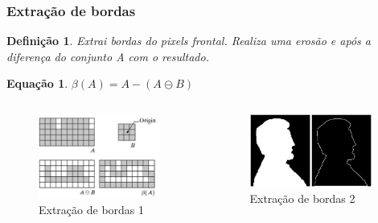 \documentclass[aspectratio=169]{beamer}
\theoremstyle{Definition}
\newtheorem{defn}{Defini\c c\~ao}
\newtheorem{eq}[theorem]{Equa\c c\~ao}
\begin{document}
\begin{frame}
	\frametitle{Extração de bordas}
	
	\begin{defn}
    	Extrai bordas do pixels frontal. Realiza uma erosão e após a diferença do conjunto A com o resultado.
	\end{defn}
	
	\begin{eq}
    	$ \beta(A) = A  - (A \circleddash B)$ 
	\end{eq}
	
	\begin{columns}
		\begin{column}{0.5\textwidth}
			\begin{figure}[h]
	  		 	\includegraphics[width=4cm, height=0.25\paperheight]{imagens/border_ex1}
				\caption{Extração de bordas 1}\label{figBorder1}
			\end{figure}
		\end{column}
		\begin{column}{0.5\textwidth}
			\begin{figure}[h]
			   	\includegraphics[width=4cm, height=0.25\paperheight]{imagens/border_ex2}
				\caption{Extração de bordas 2}\label{figBorder2}
			\end{figure}
		\end{column}
	\end{columns}
	
\end{frame}
\end{document}
